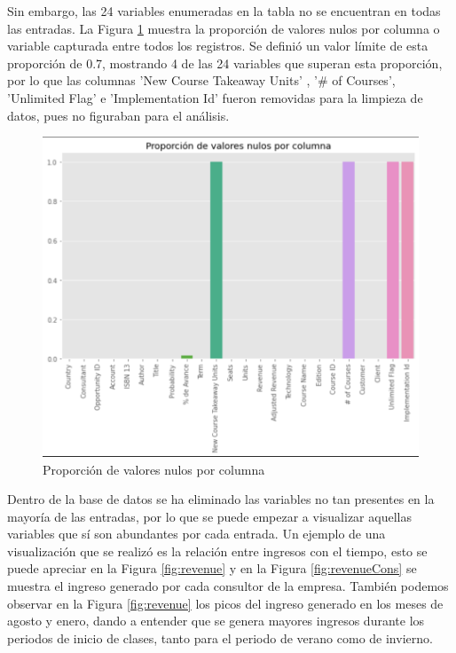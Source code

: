 \documentclass{article}
\begin{document}
        Sin embargo, las 24 variables enumeradas en la tabla no se encuentran en todas las entradas. La Figura \ref{fig:propValNul} muestra la proporción de valores nulos por columna o variable capturada entre todos los registros. Se definió un valor límite de esta proporción de 0.7, mostrando 4 de las 24 variables que superan esta proporción, por lo que las columnas 'New Course Takeaway Units' , '$\#$ of Courses', 'Unlimited Flag' e 'Implementation Id' fueron removidas para la limpieza de datos, pues no figuraban para el análisis.
        \newpage
        \begin{figure}[h!]
            \centering
            \includegraphics[width=\columnwidth]{img/null_proportion.png}
            \caption{Proporción de valores nulos por columna}
            \label{fig:propValNul}
        \end{figure}

        Dentro de la base de datos se ha eliminado las variables no tan presentes en la mayoría de las entradas, por lo que se puede empezar a visualizar aquellas variables que sí son abundantes por cada entrada. Un ejemplo de una visualización que se realizó es la relación entre ingresos con el tiempo, esto se puede apreciar en la Figura \ref{fig:revenue} y en la Figura \ref{fig:revenueCons} se muestra el ingreso generado por cada consultor de la empresa.
        También podemos observar en la Figura \ref{fig:revenue} los picos del ingreso generado en los meses de agosto y enero, dando a entender que se genera mayores ingresos durante los periodos de inicio de clases, tanto para el periodo de verano como de invierno.
\end{document}
